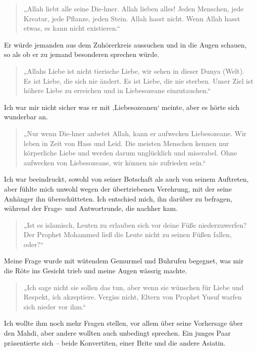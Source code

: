 \documentclass[12pt]{memoir}
\begin{document}
\begin{quote}
„Allah liebt alle seine Die-hner.
Allah lieben alles!
Jeden Menschen, jede Kreatur, jede Pflanze, jeden Stein.
Allah hasst nicht.
Wenn Allah hasst etwas, es kann nicht existieren.“
\end{quote}

Er würde jemanden aus dem Zuhörerkreis aussuchen und in die Augen schauen,
so als ob er zu jemand besonderen sprechen würde.

\begin{quote}
„Allahs Liebe ist nicht tierische Liebe, wir sehen in dieser Dunya (Welt).
Es ist Liebe, die sich nie ändert.
Es ist Liebe, die nie sterben.
Unser Ziel ist höhere Liebe zu erreichen und in Liebesozeane einzutauchen.“
\end{quote}

Ich war mir nicht sicher was er mit ‚Liebesozeanen‘ meinte,
aber es hörte sich wunderbar an.

\begin{quote}
„Nur wenn Die-hner anbetet Allah, kann er aufwecken Liebesozeane.
Wir leben in Zeit von Hass und Leid.
Die meisten Menschen kennen nur körperliche Liebe
und werden darum unglücklich und miserabel.
Ohne aufwecken von Liebesozeane, wir können nie zufrieden sein.“
\end{quote}

Ich war beeindruckt, sowohl von seiner Botschaft als auch von seinem Auftreten,
aber fühlte mich unwohl wegen der übertriebenen Verehrung,
mit der seine Anhänger ihn überschütteten.
Ich entschied mich, ihn darüber zu befragen,
während der Frage- und Antwortrunde, die nachher kam.

\begin{quote}
„Ist es islamisch, Leuten zu erlauben sich vor deine Füße niederzuwerfen?
Der Prophet Mohammed ließ die Leute nicht zu seinen Füßen fallen, oder?“
\end{quote}

Meine Frage wurde mit wütendem Gemurmel und Buhrufen begegnet,
was mir die Röte ins Gesicht trieb und meine Augen wässrig machte.

\begin{quote}
„Ich sage nicht sie sollen das tun,
aber wenn sie wünschen für Liebe und Respekt, ich akzeptiere.
Vergiss nicht, Eltern von Prophet Yusuf warfen sich nieder vor ihm.“
\end{quote}

Ich wollte ihm noch mehr Fragen stellen,
vor allem über seine Vorhersage über den Mahdi,
aber andere wollten auch unbedingt sprechen.
Ein junges Paar präsentierte sich –
beide Konvertiten, einer Brite und die andere Asiatin.
\end{document}
